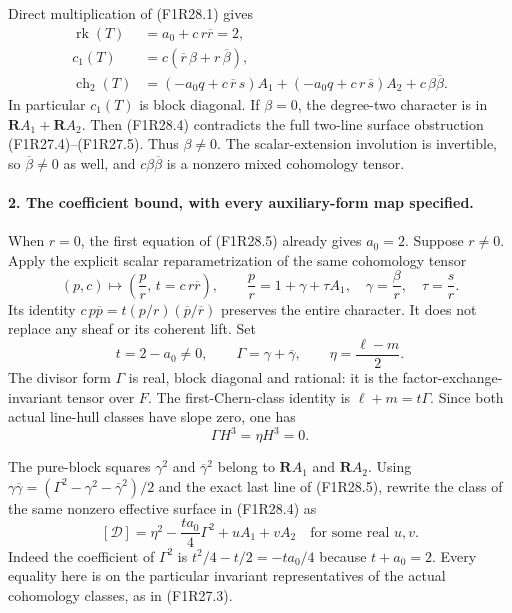 Direct multiplication of (F1R28.1) gives
\[
 \begin{split}
 \operatorname{rk}(T)&=a_0+c\,r\overline r=2,\\
 c_1(T)&=c(\overline r\,\beta+r\,\overline\beta),\\
 \operatorname{ch}_2(T)
   &=(-a_0q+c\,\overline r\,s)A_1
        +(-a_0q+c\,r\,\overline s)A_2
        +c\,\beta\overline\beta .
 \end{split}
 \tag{F1R28.5}
\]
In particular $c_1(T)$ is block diagonal.
If $\beta=0$, the degree-two character is in
$\mathbf R A_1+\mathbf R A_2$.
Then (F1R28.4) contradicts the full two-line
surface obstruction (F1R27.4)--(F1R27.5).
Thus $\beta\ne0$.
The scalar-extension involution is invertible,
so $\overline\beta\ne0$ as well, and
$c\beta\overline\beta$ is a nonzero mixed
cohomology tensor.

\paragraph{2. The coefficient bound, with every auxiliary-form map specified.}
When $r=0$, the first equation of (F1R28.5)
already gives $a_0=2$.
Suppose $r\ne0$. Apply the explicit scalar
reparametrization of the same cohomology tensor
\[
 (p,c)\longmapsto
       \left(\frac p r,\,t=c\,r\overline r\right),\qquad
 \frac p r=1+\gamma+\tau A_1,\quad
 \gamma=\frac\beta r,\quad \tau=\frac s r.
 \tag{F1R28.6}
\]
Its identity
$c\,p\overline p=t(p/r)(\overline p/\overline r)$
preserves the entire character. It does not
replace any sheaf or its coherent lift.
Set
\[
       t=2-a_0\ne0,\qquad
       \Gamma=\gamma+\overline\gamma,\qquad
       \eta=\frac{\ell-m}{2}.
 \tag{F1R28.7}
\]
The divisor form $\Gamma$ is real, block
diagonal and rational: it is the
factor-exchange-invariant tensor over $F$.
The first-Chern-class identity is
$\ell+m=t\Gamma$.
Since both actual line-hull classes have
slope zero, one has
\[
                     \Gamma H^3=\eta H^3=0.
 \tag{F1R28.8}
\]

The pure-block squares
$\gamma^2$ and $\overline\gamma^2$ belong to
$\mathbf R A_1$ and $\mathbf R A_2$.
Using
$\gamma\overline\gamma=
 (\Gamma^2-\gamma^2-\overline\gamma^2)/2$
and the exact last line of (F1R28.5), rewrite
the class of the same nonzero effective
surface in (F1R28.4) as
\[
       [\mathcal D]
          =\eta^2-\frac{t a_0}{4}\Gamma^2
                     +uA_1+vA_2
                    \quad\text{for some real }u,v.
 \tag{F1R28.9}
\]
Indeed the coefficient of $\Gamma^2$ is
$t^2/4-t/2=-t a_0/4$ because $t+a_0=2$.
Every equality here is on the particular
invariant representatives of the actual
cohomology classes, as in (F1R27.3).

